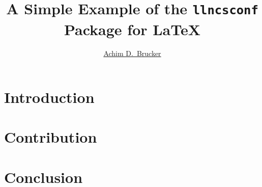 \documentclass[final, runningheads, USenglish, pdftex]{llncs}
\title{A Simple Example of the \texttt{llncsconf} Package for \LaTeX}
\author{\protect\href{http://www.brucker.ch/}{Achim D.~Brucker}}
\institute{Some Department, Somewhere}
\begin{document}
\maketitle{}
\begin{abstract}
\lipsum[1-2]
\end{abstract}

\section{Introduction}
\lipsum[1-4]

\section{Contribution}
\lipsum[5-10]

\section{Conclusion}
\lipsum[10-12]
\end{document}
